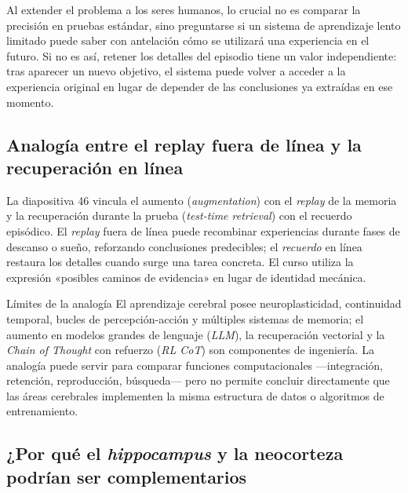 Al extender el problema a los seres humanos, lo crucial no es comparar la precisión en pruebas estándar, sino preguntarse si un sistema de aprendizaje lento limitado puede saber con antelación cómo se utilizará una experiencia en el futuro. Si no es así, retener los detalles del episodio tiene un valor independiente: tras aparecer un nuevo objetivo, el sistema puede volver a acceder a la experiencia original en lugar de depender de las conclusiones ya extraídas en ese momento.

\subsection{Analogía entre el replay fuera de línea y la recuperación en línea}

La diapositiva 46 vincula el aumento (\textit{augmentation}) con el \textit{replay} de la memoria y la recuperación durante la prueba (\textit{test-time retrieval}) con el recuerdo episódico. El \textit{replay} fuera de línea puede recombinar experiencias durante fases de descanso o sueño, reforzando conclusiones predecibles; el \textit{recuerdo} en línea restaura los detalles cuando surge una tarea concreta. El curso utiliza la expresión «posibles caminos de evidencia» en lugar de identidad mecánica.


\begin{warningbox}{Límites de la analogía}
El aprendizaje cerebral posee neuroplasticidad, continuidad temporal, bucles de percepción-acción y múltiples sistemas de memoria; el aumento en modelos grandes de lenguaje (\textit{LLM}), la recuperación vectorial y la \textit{Chain of Thought} con refuerzo (\textit{RL CoT}) son componentes de ingeniería. La analogía puede servir para comparar funciones computacionales —integración, retención, reproducción, búsqueda— pero no permite concluir directamente que las áreas cerebrales implementen la misma estructura de datos o algoritmos de entrenamiento.
\end{warningbox}

\subsection{¿Por qué el \textit{hippocampus} y la neocorteza podrían ser complementarios}


